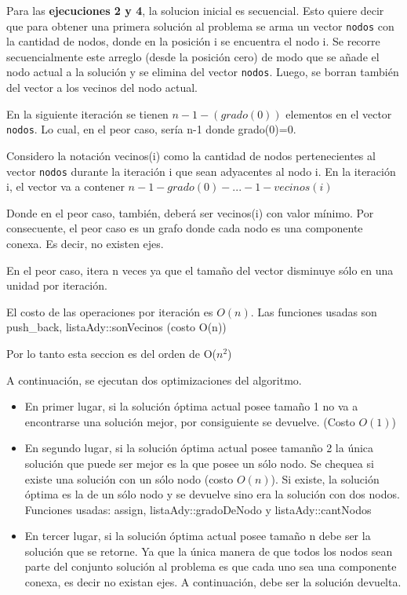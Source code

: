 \bigskip

Para las \textbf{ejecuciones 2 y 4}, la solucion inicial es secuencial. Esto quiere decir que para obtener una primera soluci\'on al problema se arma un vector \texttt{nodos} con la cantidad de nodos, donde en la posici\'on i se encuentra el nodo i.
	Se recorre secuencialmente este arreglo (desde la posici\'on cero) de modo que se a\~nade el nodo actual a la soluci\'on y se elimina del vector \texttt{nodos}.
	Luego, se borran tambi\'en del vector a los vecinos del nodo actual.

	En la siguiente iteraci\'on se tienen $n-1-(grado(0))$ elementos en el vector \texttt{nodos}.
	Lo cual, en el peor caso, ser\'ia n-1 donde grado(0)=0.

	Considero la notaci\'on vecinos(i) como la cantidad de nodos pertenecientes al vector \texttt{nodos} durante la iteraci\'on i que sean adyacentes al nodo i.
	En la iteraci\'on i, el vector va a contener $n-1-grado(0)- ... -1-vecinos(i)$

	Donde en el peor caso, tambi\'en, deber\'a ser vecinos(i) con valor m\'inimo. Por consecuente, el peor caso es un grafo donde cada nodo es una componente conexa.
	Es decir, no existen ejes.
	
	En el peor caso, itera n veces ya que el tama\~no del vector disminuye s\'olo en una unidad por iteraci\'on.

	El costo de las operaciones por iteraci\'on es $O(n)$. 
	Las funciones usadas son push_back, listaAdy::sonVecinos (costo O(n))

	Por lo tanto esta seccion es del orden de O($n^2$)

\bigskip

A continuaci\'on, se ejecutan dos optimizaciones del algoritmo.

\begin{itemize}
\item En primer lugar, si la soluci\'on \'optima actual posee tama\~no 1 no va a encontrarse una soluci\'on mejor, por consiguiente se devuelve. (Costo $O(1)$)
\item En segundo lugar, si la soluci\'on \'optima actual posee taman\~no 2 la \'unica soluci\'on que puede ser mejor es la que posee un s\'olo nodo. Se chequea si existe una soluci\'on con un s\'olo nodo (costo $O(n)$). Si existe, la soluci\'on \'optima es la de un s\'olo nodo y se devuelve sino era la soluci\'on con dos nodos. Funciones usadas: assign, listaAdy::gradoDeNodo y listaAdy::cantNodos
\item En tercer lugar, si la soluci\'on \'optima actual posee tama\~no n debe ser la soluci\'on que se retorne. Ya que la \'unica manera de que todos los nodos sean parte del conjunto soluci\'on al problema es que cada uno sea una componente conexa, es decir no existan ejes. A continuaci\'on, debe ser la soluci\'on devuelta.
\end{itemize}

